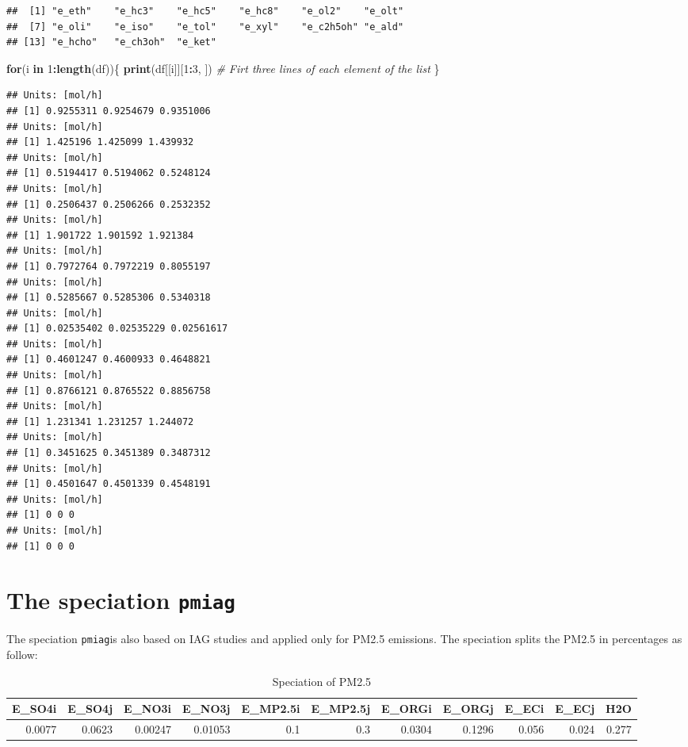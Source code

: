 \documentclass[12pt,graybox,envcountchap,sectrefs]{krantz}
\makeatletter
\newenvironment{Shaded}{\begin{snugshade}}{\end{snugshade}}
\newcommand{\KeywordTok}[1]{\textcolor[rgb]{0.13,0.29,0.53}{\textbf{#1}}}
\newcommand{\DecValTok}[1]{\textcolor[rgb]{0.00,0.00,0.81}{#1}}
\newcommand{\CommentTok}[1]{\textcolor[rgb]{0.56,0.35,0.01}{\textit{#1}}}
\newcommand{\ControlFlowTok}[1]{\textcolor[rgb]{0.13,0.29,0.53}{\textbf{#1}}}
\newcommand{\OperatorTok}[1]{\textcolor[rgb]{0.81,0.36,0.00}{\textbf{#1}}}
\newcommand{\NormalTok}[1]{#1}
\newenvironment{kframe}{%
\medskip{}
\setlength{\fboxsep}{.8em}
 \def\at@end@of@kframe{}%
 \ifinner\ifhmode%
  \def\at@end@of@kframe{\end{minipage}}%
  \begin{minipage}{\columnwidth}%
 \fi\fi%
 \def\FrameCommand##1{\hskip\@totalleftmargin \hskip-\fboxsep
 \colorbox{shadecolor}{##1}\hskip-\fboxsep
     \hskip-\linewidth \hskip-\@totalleftmargin \hskip\columnwidth}%
 \MakeFramed {\advance\hsize-\width
   \@totalleftmargin\z@ \linewidth\hsize
   \@setminipage}}%
 {\par\unskip\endMakeFramed%
 \at@end@of@kframe}
\renewenvironment{Shaded}{\begin{kframe}}{\end{kframe}}
\theoremstyle{definition}
\theoremstyle{definition}
\theoremstyle{definition}
\theoremstyle{remark}
\makeatother
\begin{document}
\begin{verbatim}
##  [1] "e_eth"    "e_hc3"    "e_hc5"    "e_hc8"    "e_ol2"    "e_olt"   
##  [7] "e_oli"    "e_iso"    "e_tol"    "e_xyl"    "e_c2h5oh" "e_ald"   
## [13] "e_hcho"   "e_ch3oh"  "e_ket"
\end{verbatim}

\begin{Shaded}
\begin{Highlighting}[]
\ControlFlowTok{for}\NormalTok{(i }\ControlFlowTok{in} \DecValTok{1}\OperatorTok{:}\KeywordTok{length}\NormalTok{(df))\{}
  \KeywordTok{print}\NormalTok{(df[[i]][}\DecValTok{1}\OperatorTok{:}\DecValTok{3}\NormalTok{, ]) }\CommentTok{# Firt three lines of each element of the list}
\NormalTok{\}}
\end{Highlighting}
\end{Shaded}

\begin{verbatim}
## Units: [mol/h]
## [1] 0.9255311 0.9254679 0.9351006
## Units: [mol/h]
## [1] 1.425196 1.425099 1.439932
## Units: [mol/h]
## [1] 0.5194417 0.5194062 0.5248124
## Units: [mol/h]
## [1] 0.2506437 0.2506266 0.2532352
## Units: [mol/h]
## [1] 1.901722 1.901592 1.921384
## Units: [mol/h]
## [1] 0.7972764 0.7972219 0.8055197
## Units: [mol/h]
## [1] 0.5285667 0.5285306 0.5340318
## Units: [mol/h]
## [1] 0.02535402 0.02535229 0.02561617
## Units: [mol/h]
## [1] 0.4601247 0.4600933 0.4648821
## Units: [mol/h]
## [1] 0.8766121 0.8765522 0.8856758
## Units: [mol/h]
## [1] 1.231341 1.231257 1.244072
## Units: [mol/h]
## [1] 0.3451625 0.3451389 0.3487312
## Units: [mol/h]
## [1] 0.4501647 0.4501339 0.4548191
## Units: [mol/h]
## [1] 0 0 0
## Units: [mol/h]
## [1] 0 0 0
\end{verbatim}

\section{\texorpdfstring{The speciation
\texttt{pmiag}}{The speciation pmiag}}\label{the-speciation-pmiag}

The speciation \texttt{pmiag}is also based on IAG studies and applied
only for PM2.5 emissions. The speciation splits the PM2.5 in percentages
as follow:

\begin{table}

\caption{\label{tab:unnamed-chunk-105}Speciation of PM2.5}
\centering
\begin{tabular}[t]{r|r|r|r|r|r|r|r|r|r|r}
\hline
E\_SO4i & E\_SO4j & E\_NO3i & E\_NO3j & E\_MP2.5i & E\_MP2.5j & E\_ORGi & E\_ORGj & E\_ECi & E\_ECj & H2O\\
\hline
0.0077 & 0.0623 & 0.00247 & 0.01053 & 0.1 & 0.3 & 0.0304 & 0.1296 & 0.056 & 0.024 & 0.277\\
\hline
\end{tabular}
\end{table}
\end{document}
